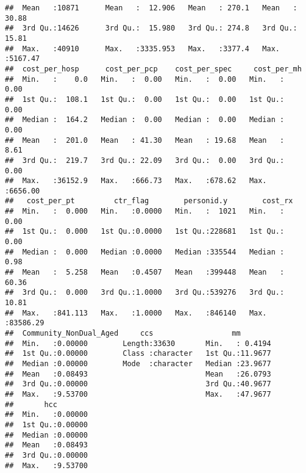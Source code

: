 \documentclass[]{article}
\begin{document}
\begin{verbatim}
##  Mean   :10871      Mean   :  12.906   Mean   : 270.1   Mean   :  30.88  
##  3rd Qu.:14626      3rd Qu.:  15.980   3rd Qu.: 274.8   3rd Qu.:  15.81  
##  Max.   :40910      Max.   :3335.953   Max.   :3377.4   Max.   :5167.47  
##  cost_per_hosp      cost_per_pcp    cost_per_spec     cost_per_mh     
##  Min.   :    0.0   Min.   :  0.00   Min.   :  0.00   Min.   :   0.00  
##  1st Qu.:  108.1   1st Qu.:  0.00   1st Qu.:  0.00   1st Qu.:   0.00  
##  Median :  164.2   Median :  0.00   Median :  0.00   Median :   0.00  
##  Mean   :  201.0   Mean   : 41.30   Mean   : 19.68   Mean   :   8.61  
##  3rd Qu.:  219.7   3rd Qu.: 22.09   3rd Qu.:  0.00   3rd Qu.:   0.00  
##  Max.   :36152.9   Max.   :666.73   Max.   :678.62   Max.   :6656.00  
##   cost_per_pt         ctr_flag        personid.y        cost_rx        
##  Min.   :  0.000   Min.   :0.0000   Min.   :  1021   Min.   :    0.00  
##  1st Qu.:  0.000   1st Qu.:0.0000   1st Qu.:228681   1st Qu.:    0.00  
##  Median :  0.000   Median :0.0000   Median :335544   Median :    0.98  
##  Mean   :  5.258   Mean   :0.4507   Mean   :399448   Mean   :   60.36  
##  3rd Qu.:  0.000   3rd Qu.:1.0000   3rd Qu.:539276   3rd Qu.:   10.81  
##  Max.   :841.113   Max.   :1.0000   Max.   :846140   Max.   :83586.29  
##  Community_NonDual_Aged     ccs                  mm         
##  Min.   :0.00000        Length:33630       Min.   : 0.4194  
##  1st Qu.:0.00000        Class :character   1st Qu.:11.9677  
##  Median :0.00000        Mode  :character   Median :23.9677  
##  Mean   :0.08493                           Mean   :26.0793  
##  3rd Qu.:0.00000                           3rd Qu.:40.9677  
##  Max.   :9.53700                           Max.   :47.9677  
##       hcc         
##  Min.   :0.00000  
##  1st Qu.:0.00000  
##  Median :0.00000  
##  Mean   :0.08493  
##  3rd Qu.:0.00000  
##  Max.   :9.53700
\end{verbatim}
\end{document}
